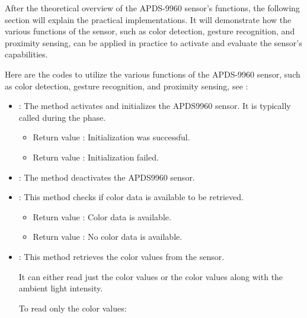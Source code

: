 After the theoretical overview of the APDS-9960 sensor's functions, the following section will explain the practical implementations. It will demonstrate how the various functions of the sensor, such as color detection, gesture recognition, and proximity sensing, can be applied in practice to activate and evaluate the sensor's capabilities.

\medskip

Here are the codes to utilize the various functions of the APDS-9960 sensor, such as color detection, gesture recognition, and proximity sensing, see \cite{ArduinoAPDS9960:2024}:

\begin{itemize}
	\item {}: The  method activates and initializes the APDS9960 sensor. It is typically called during the  phase.
	
	\medskip
	
	\begin{itemize}
		\item Return value : Initialization was successful.
		\item Return value : Initialization failed.
	\end{itemize}
	
	\item {}: The  method deactivates the APDS9960 sensor.
	
	
	\item {}: This method checks if color data is available to be retrieved.
	
	\medskip
	
	\begin{itemize}
		\item Return value : Color data is available.
		\item Return value : No color data is available.
	\end{itemize}
	
	\item {}: This method retrieves the color values from the sensor.
	
	It can either read just the color values or the color values along with the ambient light intensity.
	
	\medskip
	
	To read only the color values:
	
	

\end{itemize}
